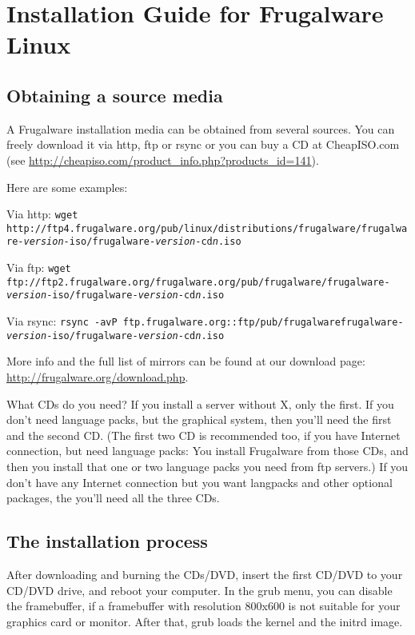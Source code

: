 \chapter{Installation Guide for Frugalware Linux}
\section{Obtaining a source media}

A Frugalware installation media can be obtained from several sources. You can freely download it via http, ftp or rsync or you can buy a CD at CheapISO.com (see \url{http://cheapiso.com/product\_info.php?products\_id=141}).

Here are some examples:

Via http: {\tt wget http://ftp4.frugalware.org/pub/linux/distributions/frugalware/frugalware-\textit{version}-iso/frugalware-\textit{version}-cd\textit{n}.iso}

Via ftp: {\tt wget ftp://ftp2.frugalware.org/frugalware.org/pub/frugalware/frugalware-\textit{version}-iso/frugalware-\textit{version}-cd\textit{n}.iso}

Via rsync: {\tt rsync -avP ftp.frugalware.org::ftp/pub/frugalwarefrugalware-\textit{version}-iso/frugalware-\textit{version}-cd\textit{n}.iso}

More info and the full list of mirrors can be found at our download page: \url{http://frugalware.org/download.php}.

What CDs do you need? If you install a server without X, only the first. If you don't need language packs, but the graphical system, then you'll need the first and the second CD. (The first two CD is recommended too, if you have Internet connection, but need language packs: You install Frugalware from those CDs, and then you install that one or two language packs you need from ftp servers.) If you don't have any Internet connection but you want langpacks and other optional packages, the you'll need all the three CDs.

\section{The installation process}

After downloading and burning the CDs/DVD, insert the first CD/DVD to your CD/DVD drive, and reboot your computer. In the grub menu, you can disable the framebuffer, if a framebuffer with resolution 800x600 is not suitable for your graphics card or monitor. After that, grub loads the kernel and the initrd image.

